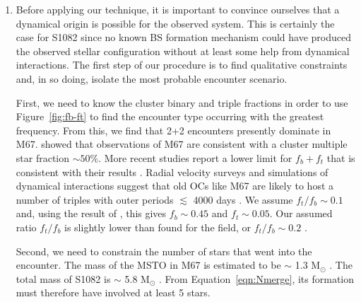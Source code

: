 \begin{enumerate}

\item Before applying our technique, it is important to convince
  ourselves that a dynamical origin is possible for the observed
  system.  This is certainly the case for S1082 since no known BS
  formation mechanism could have produced the observed stellar configuration
  without at least some help from dynamical interactions.  The first
  step of our procedure is to find qualitative constraints and,
  in so doing, isolate the most probable encounter scenario.  

First, we need to know the cluster binary and triple fractions in
order to use Figure~\ref{fig:fb-ft} to find the encounter type
occurring with the greatest frequency.  From this, we find that 2+2
encounters presently dominate in M67.  \citet{fan96} showed
that observations of M67 are consistent with a 
cluster multiple star fraction $\sim 50\%$.  More recent
studies report a lower limit for $f_b + f_t$ that is consistent with their
results \citep[e.g.][]{latham05, davenport10}.  Radial
velocity surveys and simulations
of dynamical interactions suggest that old OCs like
M67 are likely to host a number of triples with outer periods
$\lesssim$ 4000
days \citep[e.g.][]{latham05, ivanova08}.  We assume 
$f_t/f_b \sim 0.1$ and, using the result of \citet{fan96}, this gives
$f_b \sim 0.45$ and $f_t \sim 0.05$.  Our assumed ratio $f_t/f_b$ is
slightly lower than found for the field, or $f_t/f_b \sim 0.2$
\citep{eggleton08}. 

Second, we need to constrain the number of stars that went into the
encounter.  The mass of the MSTO in M67 is estimated to be $\sim$ 1.3
M$_{\odot}$ \citep{mathieu09}.  The total mass of S1082 is $\sim$ 5.8
M$_{\odot}$ \citep{sandquist03}.  From Equation~\ref{eqn:Nmerge}, its
formation must therefore have involved at least 5 stars.  


\end{enumerate}
